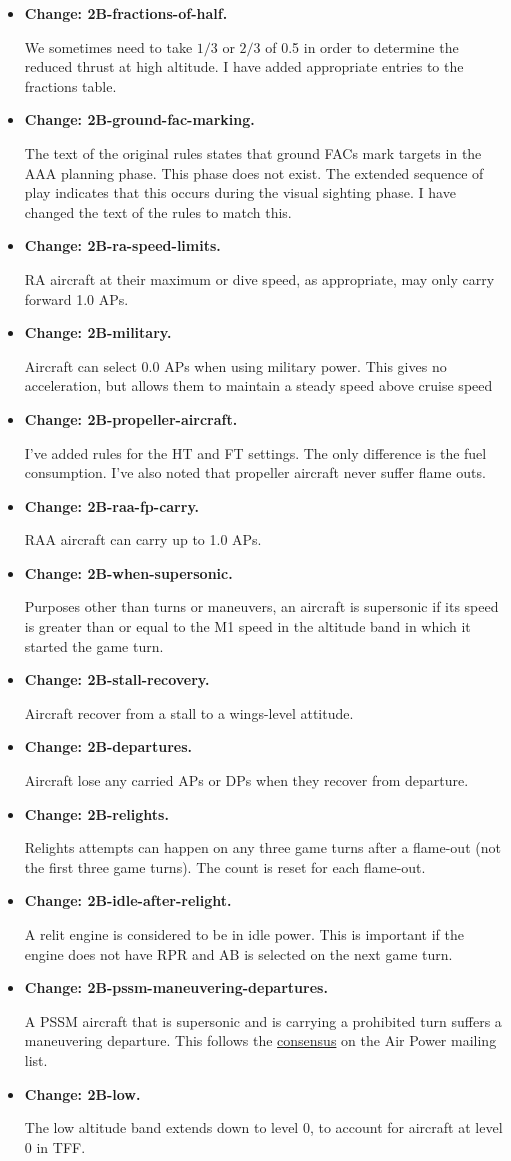 \documentclass[10pt]{report}
\newcommand{\itemtag}[1]{\item \textbf{Change: #1.}\par}
\begin{document}
\begin{itemize}
    \itemtag{2B-fractions-of-half} We sometimes need to take $1/3$ or $2/3$ of 0.5 in order to determine the reduced thrust at high altitude. I have added appropriate entries to the fractions table.

    \itemtag{2B-ground-fac-marking} The text of the original rules states that ground FACs mark targets in the AAA planning phase. This phase does not exist. The extended sequence of play indicates that this occurs during the visual sighting phase. I have changed the text of the rules to match this.

    \itemtag{2B-ra-speed-limits} RA aircraft at their maximum or dive speed, as appropriate, may only carry forward 1.0 APs.

    \itemtag{2B-military} Aircraft can select 0.0 APs when using military power. This gives no acceleration, but allows them to maintain a steady speed above cruise speed
    
    \itemtag{2B-propeller-aircraft} I’ve added rules for the HT and FT settings. The only difference is the fuel consumption. I’ve also noted that propeller aircraft never suffer flame outs.
    
    \itemtag{2B-raa-fp-carry}{RAA aircraft can carry up to 1.0 APs.}
    
    \itemtag{2B-when-supersonic} Purposes other than turns or maneuvers, an aircraft is supersonic if its speed is greater than or equal to the M1 speed in the altitude band in which it started the game turn.

    \itemtag{2B-stall-recovery} Aircraft recover from a stall to a wings-level attitude.

    \itemtag{2B-departures} Aircraft lose any carried APs or DPs when they recover from departure.
    
    \itemtag{2B-relights} Relights attempts can happen on any three game turns after a flame-out (not the first three game turns). The count is reset for each flame-out.

    \itemtag{2B-idle-after-relight} A relit engine is considered to be in idle power. This is important if the engine does not have RPR and AB is selected on the next game turn.
    
    \itemtag{2B-pssm-maneuvering-departures} A PSSM aircraft that is supersonic and is carrying a prohibited turn suffers a maneuvering departure. This follows the \href{https://airpower.groups.io/g/main/message/2519}{consensus} on the Air Power mailing list.

    \itemtag{2B-low} The low altitude band extends down to level 0, to account for aircraft at level 0 in TFF.


\end{itemize}
\end{document}
